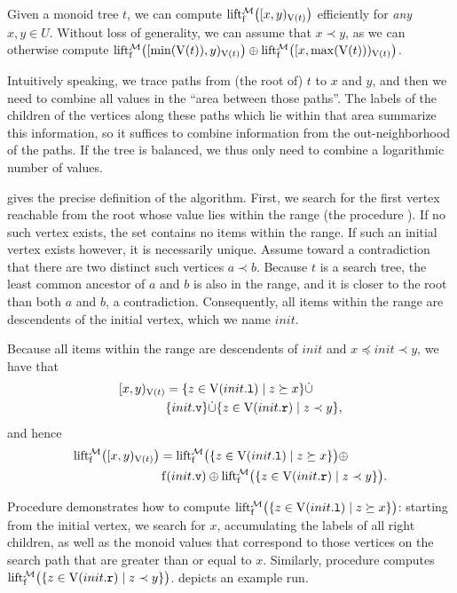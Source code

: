 \documentclass[conference]{IEEEtran}
\begin{document}
Given a monoid tree $t$, we can compute $\operatorname{lift_{\operatorname{f}}^{\mathcal{M}}}\bigl([{x},{y})_{\operatorname{V}(t)}\bigr)$ efficiently for \textit{any} $x, y \in U$. Without loss of generality, we can assume that $x \prec y$, as we can otherwise compute $\operatorname{lift_{\operatorname{f}}^{\mathcal{M}}}\bigl([{\min(\operatorname{V}(t))},{y})_{\operatorname{V}(t)}\bigr) \oplus \operatorname{lift_{\operatorname{f}}^{\mathcal{M}}}\bigl([{x},{\max(\operatorname{V}(t))})_{\operatorname{V}(t)}\bigr)$.

Intuitively speaking, we trace paths from (the root of) $t$ to $x$ and $y$, and then we need to combine all values in the ``area between those paths''. The labels of the children of the vertices along these paths which lie within that area summarize this information, so it suffices to combine information from the out-neighborhood of the paths. If the tree is balanced, we thus only need to combine a logarithmic number of values.

 gives the precise definition of the algorithm. First, we search for the first vertex reachable from the root whose value lies within the range (the procedure ). If no such vertex exists, the set contains no items within the range. If such an initial vertex exists however, it is necessarily unique. Assume toward a contradiction that there are two distinct such vertices $a \prec b$. Because $t$ is a search tree, the least common ancestor of $a$ and $b$ is also in the range, and it is closer to the root than both $a$ and $b$, a contradiction. Consequently, all items within the range are descendents of the initial vertex, which we name $init$.

Because all items within the range are descendents of $init$ and $x \preceq init \prec y$, we have that \begin{align*}
	[{x},{y})_{\operatorname{V}(t)} &= \{z \in \operatorname{V}({init}\mathtt{.l}) \mid z \succeq x\} \dot{\cup}\\
	&\{{init}\mathtt{.v}\} \dot{\cup} \{z \in \operatorname{V}({init}\mathtt{.r}) \mid z \prec y\},
\end{align*} and hence \begin{align*}
	\operatorname{lift_{\operatorname{f}}^{\mathcal{M}}}\bigl([{x},{y})_{\operatorname{V}(t)}\bigr) &= \operatorname{lift_{\operatorname{f}}^{\mathcal{M}}}\bigl(\{z \in \operatorname{V}({init}\mathtt{.l}) \mid z \succeq x\}\bigr) \oplus\\
	&\operatorname{f}({init}\mathtt{.v}) \oplus \operatorname{lift_{\operatorname{f}}^{\mathcal{M}}}\bigl(\{z \in \operatorname{V}({init}\mathtt{.r}) \mid z \prec y\}\bigr).
\end{align*}

Procedure  demonstrates how to compute $\operatorname{lift_{\operatorname{f}}^{\mathcal{M}}}\bigl(\{z \in \operatorname{V}({init}\mathtt{.l}) \mid z \succeq x\}\bigr)$: starting from the initial vertex, we search for $x$, accumulating the labels of all right children, as well as the monoid values that correspond to those vertices on the search path that are greater than or equal to $x$. Similarly, procedure  computes $\operatorname{lift_{\operatorname{f}}^{\mathcal{M}}}\bigl(\{z \in \operatorname{V}({init}\mathtt{.r}) \mid z \prec y\}\bigr)$.  depicts an example run.
\end{document}
